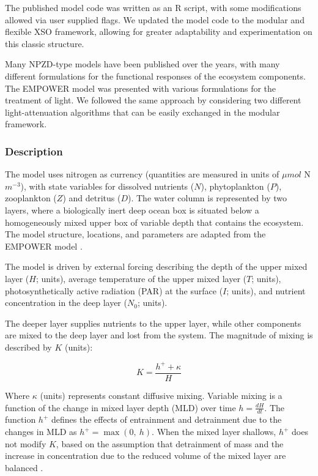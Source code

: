 \documentclass[journal abbreviation, manuscript]{copernicus}
\begin{document}
The published model code was written as an R script, with some modifications allowed via user supplied flags. We updated the model code to the modular and flexible XSO framework, allowing for greater adaptability and experimentation on this classic structure.

Many NPZD-type models have been published over the years, with many different formulations for the functional responses of the ecosystem components. The EMPOWER model was presented with various formulations for the treatment of light. We followed the same approach by considering two different light-attenuation algorithms that can be easily exchanged in the modular framework.

\subsubsection{Description}
The model uses nitrogen as currency (quantities are measured in units of $\mu mol$ N $m^{-3}$), with state variables for dissolved nutrients ($N$), phytoplankton ($P$), zooplankton ($Z$) and detritus ($D$). The water column is represented by two layers, where a biologically inert deep ocean box is situated below a homogeneously mixed upper box of variable depth that contains the ecosystem. The model structure, locations, and parameters are adapted from the EMPOWER model \citep{Anderson2015c}.

The model is driven by external forcing describing the depth of the upper mixed layer ($H$; units), average temperature of the upper mixed layer ($T$; units), photosynthetically active radiation (PAR) at the surface ($I$; units), and nutrient concentration in the deep layer ($N_0$; units). 

The deeper layer supplies nutrients to the upper layer, while other components are mixed to the deep layer and lost from the system. The magnitude of mixing is described by $K$ (units):

\begin{equation}
    K = \frac{h^{+} + \kappa}{H}
\end{equation}

Where $\kappa$ (units) represents constant diffusive mixing. Variable mixing is a function of the change in mixed layer depth (MLD) over time $h = \frac{dH}{dt}$. The function $h^{+}$ defines the effects of entrainment and detrainment due to the changes in MLD as $h^{+} = \max(0, \ h)$. When the mixed layer shallows, $h^{+}$ does not modify $K$, based on the assumption that detrainment of mass and the increase in concentration due to the reduced volume of the mixed layer are balanced \citep{Evans1985ACycles}. 
\end{document}
